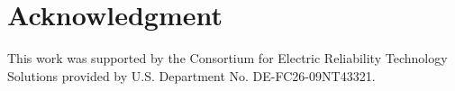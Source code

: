 \documentclass[journal]{IEEEtran}
\begin{document}
\section{Acknowledgment}
This work was supported by the Consortium for Electric Reliability Technology Solutions provided by U.S. Department No. DE-FC26-09NT43321.


















\appendices























\ifCLASSOPTIONcaptionsoff
  \newpage
\fi
\end{document}
